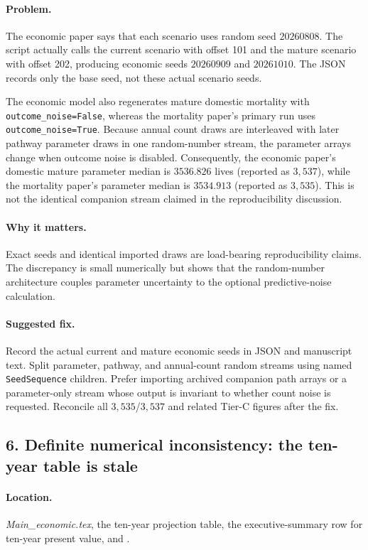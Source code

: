 \documentclass[11pt]{article}
\begin{document}
\paragraph{Problem.}
The economic paper says that each scenario uses random seed \(20260808\).  The
script actually calls the current scenario with offset 101 and the mature
scenario with offset 202, producing economic seeds \(20260909\) and
\(20261010\).  The JSON records only the base seed, not these actual scenario
seeds.

The economic model also regenerates mature domestic mortality with
\texttt{outcome\_noise=False}, whereas the mortality paper's primary run uses
\texttt{outcome\_noise=True}.  Because annual count draws are interleaved with
later pathway parameter draws in one random-number stream, the parameter arrays
change when outcome noise is disabled.  Consequently, the economic paper's
domestic mature parameter median is \(3536.826\) lives (reported as
\(3{,}537\)), while the mortality paper's parameter median is \(3534.913\)
(reported as \(3{,}535\)).  This is not the identical companion stream claimed
in the reproducibility discussion.

\paragraph{Why it matters.}
Exact seeds and identical imported draws are load-bearing reproducibility
claims.  The discrepancy is small numerically but shows that the random-number
architecture couples parameter uncertainty to the optional predictive-noise
calculation.

\paragraph{Suggested fix.}
Record the actual current and mature economic seeds in JSON and manuscript
text.  Split parameter, pathway, and annual-count random streams using named
\texttt{SeedSequence} children.  Prefer importing archived companion path
arrays or a parameter-only stream whose output is invariant to whether count
noise is requested.  Reconcile all \(3{,}535\)/\(3{,}537\) and related Tier-C
figures after the fix.

\subsection*{6. Definite numerical inconsistency: the ten-year table is stale}

\paragraph{Location.}
\emph{Main\_economic.tex}, the ten-year projection table, the
executive-summary row for ten-year present value, and
.
\end{document}
